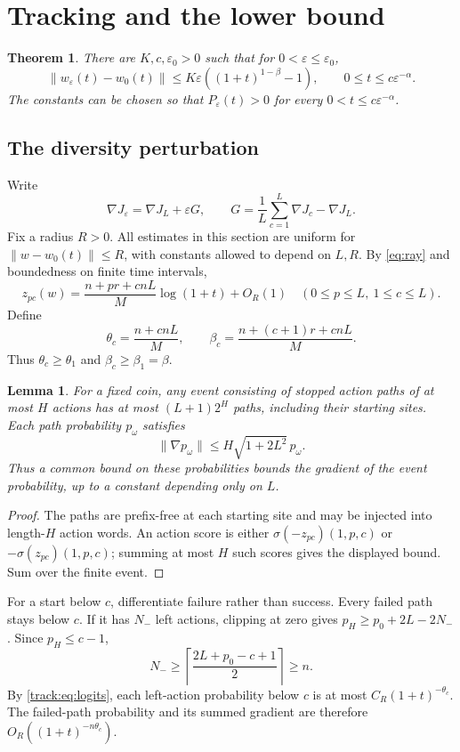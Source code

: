 \documentclass[11pt]{article}
\newtheorem{theorem}{Theorem}\newtheorem{lemma}{Lemma}
\newcommand{\eps}{\varepsilon}\newcommand{\R}{\mathbb R}
\begin{document}
\section{Tracking and the lower bound}
\begin{theorem}\label{thm:tracking}
There are $K,c,\eps_0>0$ such that for $0<\eps\le\eps_0$,
\begin{equation}\label{eq:tracking}
 \|w_\eps(t)-w_0(t)\|\le
 K\eps((1+t)^{1-\beta}-1),\qquad 0\le t\le c\eps^{-\alpha}.
\end{equation}
The constants can be chosen so that $P_\eps(t)>0$ for every
$0<t\le c\eps^{-\alpha}$.
\end{theorem}
\subsection{The diversity perturbation}
Write
\[
 \nabla J_\eps=\nabla J_L+\eps G,\qquad
 G=\frac1L\sum_{c=1}^L\nabla J_c-\nabla J_L.
\]
Fix a radius $R>0$. All estimates in this section are uniform for
$\|w-w_0(t)\|\le R$, with constants allowed to depend on $L,R$.
By \eqref{eq:ray} and boundedness on finite time intervals,
\begin{equation}\label{track:eq:logits}
 z_{pc}(w)=\frac{n+pr+cnL}{M}\log(1+t)+O_R(1)
 \quad(0\le p\le L,\ 1\le c\le L).
\end{equation}
Define
\[
 \theta_c=\frac{n+cnL}{M},\qquad
 \beta_c=\frac{n+(c+1)r+cnL}{M}.
\]
Thus $\theta_c\ge\theta_1$ and $\beta_c\ge\beta_1=\beta$.

\begin{lemma}\label{lem:path-score}
For a fixed coin, any event consisting of stopped action paths of at most
$H$ actions has at most $(L+1)2^H$ paths, including their starting sites.
Each path probability $p_\omega$ satisfies
\[
 \|\nabla p_\omega\|\le H\sqrt{1+2L^2}\,p_\omega.
\]
Thus a common bound on these probabilities bounds the gradient of the
event probability, up to a constant depending only on $L$.
\end{lemma}
\begin{proof}
The paths are prefix-free at each starting site and may be injected into
length-$H$ action words. An action score is either
$\sigma(-z_{pc})(1,p,c)$ or $-\sigma(z_{pc})(1,p,c)$; summing at most $H$
such scores gives the displayed bound. Sum over the finite event.
\end{proof}

For a start below $c$, differentiate failure rather than success. Every
failed path stays below $c$. If it has $N_-$ left actions, clipping at zero
gives $p_H\ge p_0+2L-2N_-$. Since $p_H\le c-1$,
\[
 N_-\ge\left\lceil\frac{2L+p_0-c+1}{2}\right\rceil\ge n.
\]
By \eqref{track:eq:logits}, each left-action probability below $c$ is at most
$C_R(1+t)^{-\theta_c}$. The failed-path probability and its summed gradient
are therefore $O_R((1+t)^{-n\theta_c})$.
\end{document}
